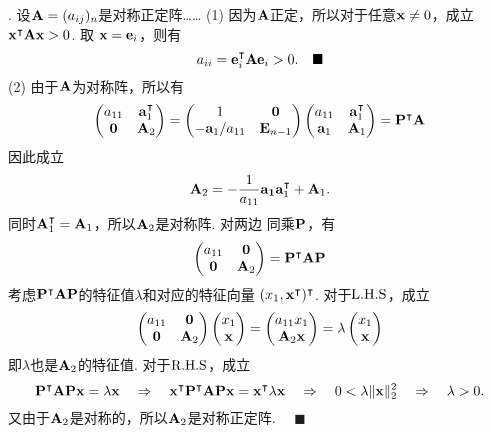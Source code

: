 . 设$\mathbf{A}=(a_{ij})_n$是对称正定阵……
\ans
(1) 因为$\mathbf{A}$正定，所以对于任意$\mathbf{x}\ne 0$，成立$\mathbf{x}^\intercal\mathbf{A}\mathbf{x} >0$. 取
    $\mathbf{x}=\mathbf{e}_i$，则有
    \[
      a_{ii} = \mathbf{e}_i^\intercal\mathbf{A}\mathbf{e}_i > 0.\quad\blacksquare
    \]
(2) 由于$\mathbf{A}$为对称阵，所以有
    \begin{equation}
      \label{equ2}
      \begin{pmatrix}
        a_{11}  &  \mathbf{a}_1^\intercal \\
        \mathbf{0} & \mathbf{A}_2
      \end{pmatrix} =
      \begin{pmatrix}
          1        &  \mathbf{0} \\
          -\mathbf{a}_1/a_{11} &  \mathbf{E}_{n-1}
      \end{pmatrix}
      \begin{pmatrix}
        a_{11}    & \mathbf{a}_1^\intercal \\
        \mathbf{a}_1 & \mathbf{A}_1
      \end{pmatrix}
      = \mathbf{P}^\intercal\mathbf{A}
    \end{equation}
    因此成立
    \[\begin{split}
      \mathbf{A}_2
       = -\frac{1}{a_{11}}\mathbf{a_1}\mathbf{a}_1^\intercal + \mathbf{A}_1. \\
    \end{split}\]
    同时$\mathbf{A}_1^\intercal = \mathbf{A}_1$，所以$\mathbf{A}_2$是对称阵. 对两边
    同乘$\mathbf{P}$，有
    \[
      \begin{pmatrix}
        a_{11} & \mathbf{0} \\
        \mathbf{0} & \mathbf{A}_2
      \end{pmatrix} =
      \mathbf{P}^\intercal\mathbf{A}\mathbf{P}
    \]
    考虑$\mathbf{P}^\intercal\mathbf{A}\mathbf{P}$的特征值$\lambda$和对应的特征向量
    $(x_1, \mathbf{x}^\intercal)^\intercal$. 对于$\text{L.H.S}$，成立
    \[
      \begin{pmatrix}
        a_{11} & \mathbf{0} \\
        \mathbf{0} & \mathbf{A}_2
      \end{pmatrix}
      \begin{pmatrix}
        x_1 \\
        \mathbf{x}
      \end{pmatrix}=
      \begin{pmatrix}
        a_{11}x_1 \\
        \mathbf{A}_2\mathbf{x}
      \end{pmatrix} = \lambda
      \begin{pmatrix}
        x_1 \\
        \mathbf{x}
      \end{pmatrix}
    \]
    即$\lambda$也是$\mathbf{A}_2$的特征值. 对于$\text{R.H.S}$，成立
    \[
      \mathbf{P}^\intercal\mathbf{A}\mathbf{P}\mathbf{x} = \lambda\mathbf{x}
      \quad\Rightarrow\quad
      \mathbf{x}^\intercal\mathbf{P}^\intercal\mathbf{A}\mathbf{P}\mathbf{x} = \mathbf{x}^\intercal\lambda\mathbf{x}
      \quad\Rightarrow\quad
      0 < \lambda\|\mathbf{x}\|_2^2
      \quad\Rightarrow\quad
      \lambda > 0.
    \]
    又由于$\mathbf{A}_2$是对称的，所以$\mathbf{A}_2$是对称正定阵. $\quad\blacksquare$

